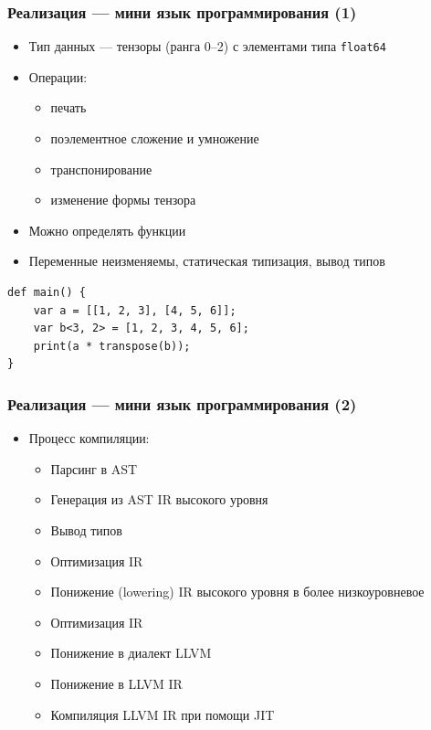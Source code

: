 \documentclass{beamer}
\begin{document}
\begin{frame}[fragile]
	\frametitle{Реализация --- мини язык программирования (1)}

	\begin{itemize}
		\item Тип данных --- тензоры (ранга 0--2) с элементами типа \texttt{float64}
		\item Операции:
		      \begin{itemize}
			      \item печать
			      \item поэлементное сложение и умножение
			      \item транспонирование
			      \item изменение формы тензора
		      \end{itemize}
		\item Можно определять функции
		\item Переменные неизменяемы, статическая типизация, вывод типов
	\end{itemize}

	\begin{lstlisting}[caption={Пример программы на мини языке программирования}, frame=single]
def main() {
    var a = [[1, 2, 3], [4, 5, 6]];
    var b<3, 2> = [1, 2, 3, 4, 5, 6];
    print(a * transpose(b));
}
\end{lstlisting}


\end{frame}

\begin{frame}[fragile]
	\frametitle{Реализация --- мини язык программирования (2)}
	\begin{itemize}
		\item Процесс компиляции:
		      \begin{itemize}
			      \item Парсинг в AST
			      \item Генерация из AST IR высокого уровня
			      \item Вывод типов
			      \item Оптимизация IR
			      \item Понижение (lowering) IR высокого уровня в более низкоуровневое
			      \item Оптимизация IR
			      \item Понижение в диалект LLVM
			      \item Понижение в LLVM IR
			      \item Компиляция LLVM IR при помощи JIT
		      \end{itemize}
	\end{itemize}
\end{frame}
\end{document}
